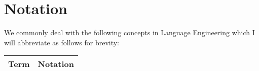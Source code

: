 \section{Notation}

We commonly deal with the following concepts in 
Language Engineering
which I will abbreviate as follows for brevity:
\begin{center}
    \begin{tabular}{ | r | c | }
        \hline
        Term & Notation \\
        \hline \hline
        \hline
    \end{tabular}
\end{center}